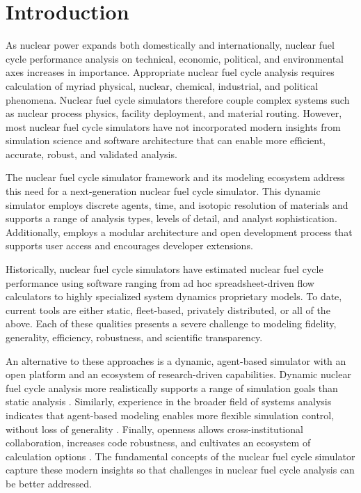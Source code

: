 
\section{Introduction}



As nuclear power expands both domestically and internationally, nuclear fuel cycle
performance analysis on technical, economic, political, and environmental axes increases 
in importance. Appropriate nuclear fuel cycle analysis requires calculation of myriad physical, nuclear, 
chemical, industrial, and political phenomena. Nuclear fuel cycle simulators 
therefore couple complex systems such as nuclear process physics, 
facility deployment, and material routing. However, most nuclear fuel cycle 
simulators have not incorporated modern insights from simulation science and 
software architecture that can enable more efficient, accurate, robust, and 
validated analysis. 

The \Cyclus nuclear fuel cycle simulator framework and 
its modeling ecosystem address this need for a next-generation nuclear fuel cycle 
simulator. This dynamic simulator employs discrete agents, time, and isotopic resolution of materials 
and supports a range of analysis types, levels of 
detail, and analyst sophistication.
Additionally, \Cyclus employs a modular architecture and 
open development process that supports user access and 
encourages developer extensions.

Historically, nuclear fuel cycle simulators have estimated 
nuclear fuel cycle performance using software 
ranging from ad hoc spreadsheet-driven flow calculators to highly specialized 
system dynamics
proprietary models. To date, current tools are either static, fleet-based, 
privately distributed, or all of the above. Each of these qualities presents a 
severe challenge to modeling fidelity, generality, efficiency, robustness, and 
scientific transparency. 

An alternative to these approaches is a dynamic, agent-based simulator with an 
open platform and an ecosystem of research-driven capabilities.  
Dynamic nuclear fuel cycle analysis more realistically 
supports a range of simulation goals than static analysis 
\cite{piet_dynamic_2011}. Similarly, experience in the broader field of systems 
analysis indicates that agent-based modeling enables more flexible simulation 
control, without loss of generality \cite{macal_agent-based_2010}. Finally, openness 
allows cross-institutional collaboration, increases code robustness, and 
cultivates an ecosystem of calculation options 
\cite{softwarecarpentryresource}.  The fundamental concepts of the \Cyclus 
nuclear fuel cycle simulator capture these modern insights so that challenges 
in nuclear fuel cycle analysis can be better addressed. 

